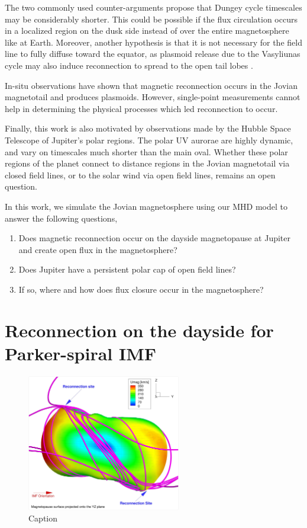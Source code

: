 The two commonly used counter-arguments propose that Dungey cycle timescales may be considerably shorter. This could be possible if the flux circulation occurs in a localized region on the dusk side instead of over the entire magnetosphere like at Earth. Moreover, another hypothesis is that it is not necessary for the field line to fully diffuse toward the equator, as plasmoid release due to the Vasyliunas cycle may also induce reconnection to spread to the open tail lobes \cite{Cowley2008}. 

In-situ observations have shown that magnetic reconnection occurs in the Jovian magnetotail and produces plasmoids. However, single-point measurements cannot help in determining the physical processes which led reconnection to occur. 

Finally, this work is also motivated by observations made by the Hubble Space Telescope of Jupiter's polar regions. The polar UV aurorae are highly dynamic, and vary on timescales much shorter than the main oval. Whether these polar regions of the planet connect to distance regions in the Jovian magnetotail via closed field lines, or to the solar wind via open field lines, remains an open question. 

In this work, we simulate the Jovian magnetosphere using our MHD model to answer the following questions,

\begin{enumerate}
    \item Does magnetic reconnection occur on the dayside magnetopause at Jupiter and create open flux in the magnetosphere?
    \item Does Jupiter have a persistent polar cap of open field lines? 
    \item If so, where and how does flux closure occur in the magnetosphere?
\end{enumerate}

\section{Reconnection on the dayside for Parker-spiral IMF}

\begin{figure}
    \centering
    \includegraphics[width=0.6\textwidth]{images4/reconnection-dayside.jpg}
    \caption{Caption}
    \label{fig:reconnection-dayside}
\end{figure}

